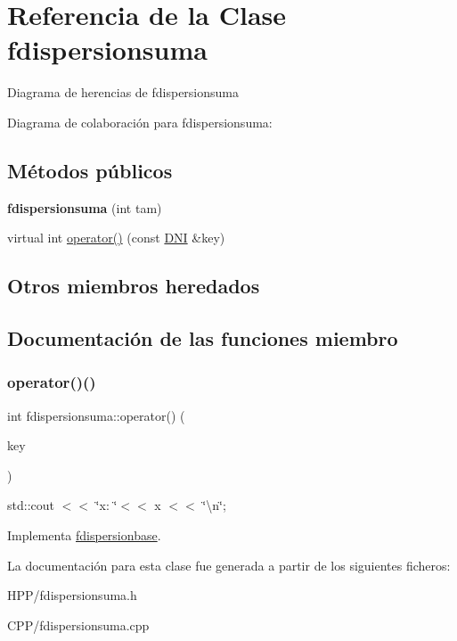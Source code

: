 \hypertarget{classfdispersionsuma}{}\section{Referencia de la Clase fdispersionsuma}
\label{classfdispersionsuma}


Diagrama de herencias de fdispersionsuma


Diagrama de colaboración para fdispersionsuma\+:
\subsection*{Métodos públicos}
\begin{DoxyCompactItemize}
\item 
\mbox{\label{classfdispersionsuma_a9e01ee2c5fb27336f9c87203f2be261b}} 
{\bfseries fdispersionsuma} (int tam)
\item 
virtual int \hyperlink{classfdispersionsuma_a791c7dd6cf93bd453770cffb45b126d7}{operator()} (const \hyperlink{classDNI}{D\+NI} \&key)
\end{DoxyCompactItemize}
\subsection*{Otros miembros heredados}


\subsection{Documentación de las funciones miembro}
\mbox{\label{classfdispersionsuma_a791c7dd6cf93bd453770cffb45b126d7}} 
\subsubsection{\texorpdfstring{operator()()}{operator()()}}
{\footnotesize\ttfamily int fdispersionsuma\+::operator() (\begin{DoxyParamCaption}\item[{const \hyperlink{classDNI}{D\+NI} \&}]{key }\end{DoxyParamCaption})\hspace{0.3cm}{\ttfamily [virtual]}}

std\+::cout $<$$<$ \char`\"{}x\+: \char`\"{}$<$$<$ x $<$$<$ \char`\"{}\textbackslash{}n\char`\"{}; 

Implementa \hyperlink{classfdispersionbase}{fdispersionbase}.



La documentación para esta clase fue generada a partir de los siguientes ficheros\+:\begin{DoxyCompactItemize}
\item 
H\+P\+P/fdispersionsuma.\+h\item 
C\+P\+P/fdispersionsuma.\+cpp\end{DoxyCompactItemize}

